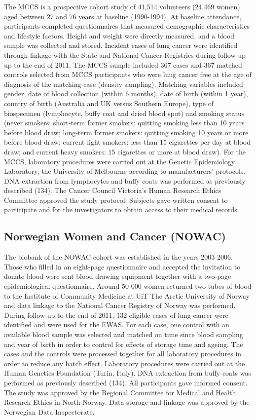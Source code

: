 \documentclass[11pt,oneside]{bristolthesis}
\begin{document}
The MCCS is a prospective cohort study of 41,514 volunteers (24,469 women) aged between 27 and 76 years at baseline (1990-1994). At baseline attendance, participants completed questionnaires that measured demographic characteristics and lifestyle factors. Height and weight were directly measured, and a blood sample was collected and stored. Incident cases of lung cancer were identified through linkage with the State and National Cancer Registries during follow-up up to the end of 2011. The MCCS sample included 367 cases and 367 matched controls selected from MCCS participants who were lung cancer free at the age of diagnosis of the matching case (density sampling). Matching variables included gender, date of blood collection (within 6 months), date of birth (within 1 year), country of birth (Australia and UK versus Southern Europe), type of biospecimen (lymphocyte, buffy coat and dried blood spot) and smoking status (never smokers; short-term former smokers: quitting smoking less than 10 years before blood draw; long-term former smokers: quitting smoking 10 years or more before blood draw; current light smokers: less than 15 cigarettes per day at blood draw; and current heavy smokers: 15 cigarettes or more at blood draw). For the MCCS, laboratory procedures were carried out at the Genetic Epidemiology Laboratory, the University of Melbourne according to manufacturers' protocols. DNA extraction from lymphocytes and buffy coats was performed as previously described (134). The Cancer Council Victoria's Human Research Ethics Committee approved the study protocol. Subjects gave written consent to participate and for the investigators to obtain access to their medical records.

\hypertarget{nowac}{%
\subsection{Norwegian Women and Cancer (NOWAC)}\label{nowac}}

The biobank of the NOWAC cohort was established in the years 2003-2006. Those who filled in an eight-page questionnaire and accepted the invitation to donate blood were sent blood drawing equipment together with a two-page epidemiological questionnaire. Around 50 000 women returned two tubes of blood to the Institute of Community Medicine at UiT The Arctic University of Norway and data linkage to the National Cancer Registry of Norway was performed. During follow-up to the end of 2011, 132 eligible cases of lung cancer were identified and were used for the EWAS. For each case, one control with an available blood sample was selected and matched on time since blood sampling and year of birth in order to control for effects of storage time and ageing. The cases and the controls were processed together for all laboratory procedures in order to reduce any batch effect. Laboratory procedures were carried out at the Human Genetics Foundation (Turin, Italy). DNA extraction from buffy coats was performed as previously described (134). All participants gave informed consent. The study was approved by the Regional Committee for Medical and Health Research Ethics in North Norway. Data storage and linkage was approved by the Norwegian Data Inspectorate.
\end{document}
